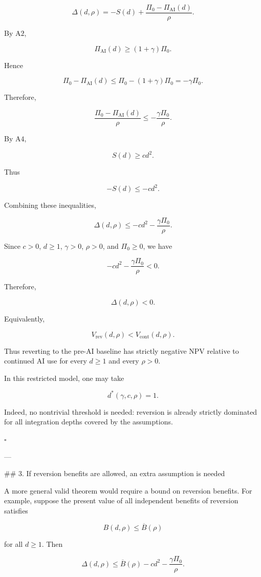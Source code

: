 \[
\Delta(d,\rho)
=
-S(d)
+
\frac{\Pi_0-\Pi_{\mathrm{AI}}(d)}{\rho}.
\]

By \(\mathrm{A2}\),

\[
\Pi_{\mathrm{AI}}(d)\ge (1+\gamma)\Pi_0.
\]

Hence

\[
\Pi_0-\Pi_{\mathrm{AI}}(d)
\le
\Pi_0-(1+\gamma)\Pi_0
=
-\gamma \Pi_0.
\]

Therefore,

\[
\frac{\Pi_0-\Pi_{\mathrm{AI}}(d)}{\rho}
\le
-\frac{\gamma \Pi_0}{\rho}.
\]

By \(\mathrm{A4}\),

\[
S(d)\ge c d^2.
\]

Thus

\[
-S(d)\le -c d^2.
\]

Combining these inequalities,

\[
\Delta(d,\rho)
\le
-cd^2
-
\frac{\gamma \Pi_0}{\rho}.
\]

Since \(c>0\), \(d\ge 1\), \(\gamma>0\), \(\rho>0\), and \(\Pi_0\ge 0\), we have

\[
-cd^2
-
\frac{\gamma \Pi_0}{\rho}
<0.
\]

Therefore,

\[
\Delta(d,\rho)<0.
\]

Equivalently,

\[
V_{\mathrm{rev}}(d,\rho)
<
V_{\mathrm{cont}}(d,\rho).
\]

Thus reverting to the pre-AI baseline has strictly negative NPV relative to continued AI use for every \(d\ge 1\) and every \(\rho>0\).

In this restricted model, one may take

\[
d^*(\gamma,c,\rho)=1.
\]

Indeed, no nontrivial threshold is needed: reversion is already strictly dominated for all integration depths covered by the assumptions.

\(\square\)

---

## 3. If reversion benefits are allowed, an extra assumption is needed

A more general valid theorem would require a bound on reversion benefits. For example, suppose the present value of all independent benefits of reversion satisfies

\[
B(d,\rho)\le \overline B(\rho)
\]

for all \(d\ge 1\). Then

\[
\Delta(d,\rho)
\le
\overline B(\rho)
-
c d^2
-
\frac{\gamma \Pi_0}{\rho}.
\]

